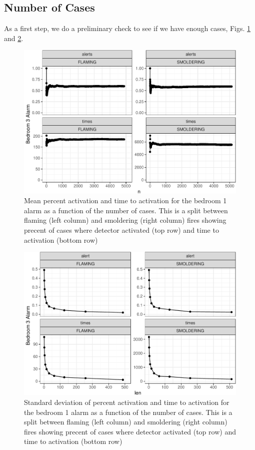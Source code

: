 \documentclass[12pt,twoside]{book}
\begin{document}
\hypertarget{number-of-cases}{%
\subsection{Number of Cases}\label{number-of-cases}}

As a first step, we do a preliminary check to see if we have enough cases, Figs. \ref{Ex_3-convergence_of_mean} and \ref{Ex_3-standard_error}.

\begin{figure}[h!]
\centering
\includegraphics[width=4.5in]{FIGURES/converg-1.pdf}
\caption{Mean percent activation and time to activation for the bedroom 1 alarm as a function of the number of cases. This is a split between flaming (left column) and smoldering (right column) fires showing precent of cases where detector activated (top row) and time to activation (bottom row) }
\label{Ex_3-convergence_of_mean}
\end{figure}
\begin{figure}[h!]
\centering
\includegraphics[width=4.5in]{FIGURES/converg-2.pdf}
\caption{Standard deviation of percent activation and time to activation for the bedroom 1 alarm as a function of the number of cases. This is a split between flaming (left column) and smoldering (right column) fires showing precent of cases where detector activated (top row) and time to activation (bottom row) }
\label{Ex_3-standard_error}
\end{figure}
\end{document}
